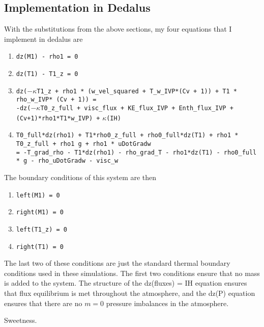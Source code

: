 \documentclass[aps, pre, onecolumn, nofootinbib, notitlepage, groupedaddress, amsfonts, amssymb, amsmath, longbibliography]{revtex4-1}
\begin{document}
\subsection{Implementation in Dedalus}
With the substitutions from the above sections, my four equations that I implement in dedalus are
\begin{enumerate}
\item \texttt{dz(M1) - rho1 = 0}
\item \texttt{dz(T1) - T1\_z = 0}
\item \texttt{dz(}$-\kappa$\texttt{T1\_z + rho1 * (w\_vel\_squared + T\_w\_IVP*(Cv + 1)) + T1 * rho\_w\_IVP* (Cv + 1)) =} \\
	  \texttt{-dz(}$-\kappa$\texttt{T0\_z\_full + visc\_flux + KE\_flux\_IVP + Enth\_flux\_IVP + (Cv+1)*rho1*T1*w\_IVP) +} $\kappa$\texttt{(IH)}
\item \texttt{T0\_full*dz(rho1) + T1*rho0\_z\_full + rho0\_full*dz(T1) + rho1 * T0\_z\_full + rho1 g + rho1 * uDotGradw} \\
	  \texttt{= -T\_grad\_rho - T1*dz(rho1) - rho\_grad\_T - rho1*dz(T1) - rho0\_full * g - rho\_uDotGradw - visc\_w }
\end{enumerate}
The boundary conditions of this system are then
\begin{enumerate}
\item \texttt{left(M1) = 0}
\item \texttt{right(M1) = 0}
\item \texttt{left(T1\_z) = 0}
\item \texttt{right(T1) = 0}
\end{enumerate}
The last two of these conditions are just the standard thermal boundary conditions used in these
simulations.  The first two conditions ensure that no mass is added to the system.  The structure of
the dz(fluxes) = IH equation ensures that flux equilibrium is met throughout the atmosphere, and the
dz(P) equation ensures that there are no $m = 0$ pressure imbalances in the atmosphere.

Sweetness.



\end{document}
